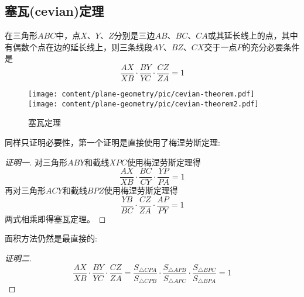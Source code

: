 \subsection{塞瓦(cevian)定理}
\label{sec:cevian-theorem}

\begin{theorem}[塞瓦定理]
  在三角形$ABC$中，点$X$、$Y$、$Z$分别是三边$AB$、$BC$、$CA$或其延长线上的点，其中有偶数个点在边的延长线上，则三条线段$AY$、$BZ$、$CX$交于一点$P$的充分必要条件是
  \begin{equation}
    \label{eq:cevian-theorem}
    \frac{AX}{XB} \cdot \frac{BY}{YC} \cdot \frac{CZ}{ZA} = 1
  \end{equation}
\end{theorem}
 
\begin{figure}[htbp]
\centering
\texttt{[image: content/plane-geometry/pic/cevian-theorem.pdf]}
\texttt{[image: content/plane-geometry/pic/cevian-theorem2.pdf]}
\caption{塞瓦定理}
\label{fig:cevian-theorem}
\end{figure}

同样只证明必要性，第一个证明是直接使用了梅涅劳斯定理:
\begin{proof}[证明一]
  对三角形$ABY$和截线$XPC$使用梅涅劳斯定理得
  \begin{equation*}
    \frac{AX}{XB} \cdot \frac{BC}{CY} \cdot \frac{YP}{PA} = 1
  \end{equation*}
  再对三角形$ACY$和截线$BPZ$使用梅涅劳斯定理得
  \begin{equation*}
    \frac{YB}{BC} \cdot \frac{CZ}{ZA} \cdot \frac{AP}{PY} = 1
  \end{equation*}
  两式相乘即得塞瓦定理。
\end{proof}

面积方法仍然是最直接的:
\begin{proof}[证明二]
  \begin{equation*}
    \frac{AX}{XB} \cdot \frac{BY}{YC} \cdot \frac{CZ}{ZA} =
    \frac{S_{\triangle CPA}}{S_{\triangle CPB}} \cdot
    \frac{S_{\triangle APB}}{S_{\triangle APC}} \cdot
    \frac{S_{\triangle BPC}}{S_{\triangle BPA}} = 1
  \end{equation*}
\end{proof}


